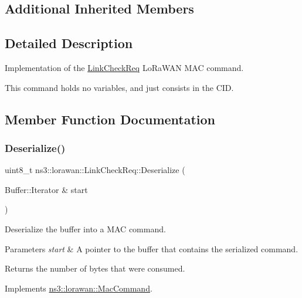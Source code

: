 \subsection*{Additional Inherited Members}


\subsection{Detailed Description}
Implementation of the \hyperlink{classns3_1_1lorawan_1_1LinkCheckReq}{Link\+Check\+Req} Lo\+Ra\+W\+AN M\+AC command.

This command holds no variables, and just consists in the C\+ID. 

\subsection{Member Function Documentation}
\mbox{\label{classns3_1_1lorawan_1_1LinkCheckReq_aa628b654164b72a55daaaa831e27166e}} 
\subsubsection{\texorpdfstring{Deserialize()}{Deserialize()}}
{\footnotesize\ttfamily uint8\+\_\+t ns3\+::lorawan\+::\+Link\+Check\+Req\+::\+Deserialize (\begin{DoxyParamCaption}\item[{Buffer\+::\+Iterator \&}]{start }\end{DoxyParamCaption})\hspace{0.3cm}{\ttfamily [virtual]}}

Deserialize the buffer into a M\+AC command.


\begin{DoxyParams}{Parameters}
{\em start} & A pointer to the buffer that contains the serialized command. \\
\hline
\end{DoxyParams}
\begin{DoxyReturn}{Returns}
the number of bytes that were consumed. 
\end{DoxyReturn}


Implements \hyperlink{classns3_1_1lorawan_1_1MacCommand_af12d223a71a67196bce498f1240eda75}{ns3\+::lorawan\+::\+Mac\+Command}.

